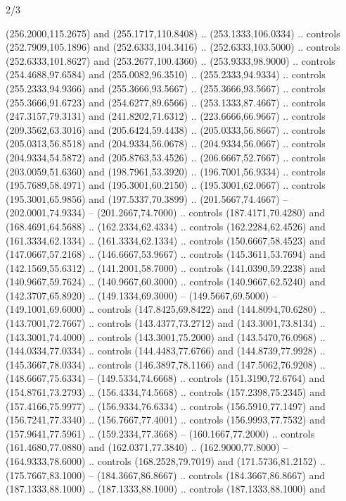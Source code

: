 \begin{flagdescription}{2/3}
\begin{scope}[xshift=0.5\flaglength,yshift=0.5\flagwidth,scale=\flagwidth/525.28]
\begin{scope}[y=0.1mm, x=0.1mm, yscale=-1,shift={(-381.5,-404)}]
\begin{scope}[shift={(5.25001,4.53053)},miter limit=4.00,line width=0.800\lw]
  (256.2000,115.2675) and (255.1717,110.8408) .. (253.1333,106.0334) .. controls
  (252.7909,105.1896) and (252.6333,104.3416) .. (252.6333,103.5000) .. controls
  (252.6333,101.8627) and (253.2677,100.4360) .. (253.9333,98.9000) .. controls
  (254.4688,97.6584) and (255.0082,96.3510) .. (255.2333,94.9334) .. controls
  (255.2333,94.9366) and (255.3666,93.5667) .. (255.3666,93.5667) .. controls
  (255.3666,91.6723) and (254.6277,89.6566) .. (253.1333,87.4667) .. controls
  (247.3157,79.3131) and (241.8202,71.6312) .. (223.6666,66.9667) .. controls
  (209.3562,63.3016) and (205.6424,59.4438) .. (205.0333,56.8667) .. controls
  (205.0313,56.8518) and (204.9334,56.0678) .. (204.9334,56.0667) .. controls
  (204.9334,54.5872) and (205.8763,53.4526) .. (206.6667,52.7667) .. controls
  (203.0059,51.6360) and (198.7961,53.3920) .. (196.7001,56.9334) .. controls
  (195.7689,58.4971) and (195.3001,60.2150) .. (195.3001,62.0667) .. controls
  (195.3001,65.9856) and (197.5337,70.3899) .. (201.5667,74.4667) --
  (202.0001,74.9334) -- (201.2667,74.7000) .. controls (187.4171,70.4280) and
  (168.4691,64.5688) .. (162.2334,62.4334) .. controls (162.2284,62.4526) and
  (161.3334,62.1334) .. (161.3334,62.1334) .. controls (150.6667,58.4523) and
  (147.0667,57.2168) .. (146.6667,53.9667) .. controls (145.3611,53.7694) and
  (142.1569,55.6312) .. (141.2001,58.7000) .. controls (141.0390,59.2238) and
  (140.9667,59.7624) .. (140.9667,60.3000) .. controls (140.9667,62.5240) and
  (142.3707,65.8920) .. (149.1334,69.3000) -- (149.5667,69.5000) --
  (149.1001,69.6000) .. controls (147.8425,69.8422) and (144.8094,70.6280) ..
  (143.7001,72.7667) .. controls (143.4377,73.2712) and (143.3001,73.8134) ..
  (143.3001,74.4000) .. controls (143.3001,75.2000) and (143.5470,76.0968) ..
  (144.0334,77.0334) .. controls (144.4483,77.6766) and (144.8739,77.9928) ..
  (145.3667,78.0334) .. controls (146.3897,78.1166) and (147.5062,76.9208) ..
  (148.6667,75.6334) -- (149.5334,74.6668) .. controls (151.3190,72.6764) and
  (154.8761,73.2793) .. (156.4334,74.5668) .. controls (157.2398,75.2345) and
  (157.4166,75.9977) .. (156.9334,76.6334) .. controls (156.5910,77.1497) and
  (156.7241,77.3340) .. (156.7667,77.4001) .. controls (156.9993,77.7532) and
  (157.9641,77.5961) .. (159.2334,77.3668) -- (160.1667,77.2000) .. controls
  (161.4680,77.0880) and (162.0371,77.3840) .. (162.9000,77.8000) --
  (164.9333,78.6000) .. controls (168.2528,79.7019) and (171.5736,81.2152) ..
  (175.7667,83.1000) -- (184.3667,86.8667) .. controls (184.3667,86.8667) and
  (187.1333,88.1000) .. (187.1333,88.1000) .. controls (187.1333,88.1000) and

\end{scope}
\end{scope}
\end{scope}
\end{flagdescription}
